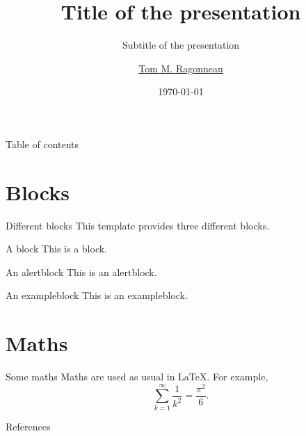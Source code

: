 \documentclass[
]{presentation}
\title{Title of the presentation}
\subtitle{Subtitle of the presentation}
\date{\today}
\author{\href{https://tomragonneau.com/}{Tom M. Ragonneau}}
\institute{
    Department of Applied Mathematics\\
    The Hong Kong Polytechnic University
}
\begin{document}
\maketitle

\begin{frame}{Table of contents}
    \tableofcontents[hideallsubsections]
\end{frame}

\section{Blocks}

\begin{frame}{Different blocks}
    This template provides \alert{three} different blocks.

    \begin{block}{A block}
        This is a block.
    \end{block}

    \begin{alertblock}{An alertblock}
        This is an alertblock.
    \end{alertblock}

    \begin{exampleblock}{An exampleblock}
        This is an exampleblock.
    \end{exampleblock}
\end{frame}

\section{Maths}

\begin{frame}{Some maths}
    Maths are used as usual in \LaTeX.
    For example,
    \begin{equation*}
        \sum_{k = 1}^{\infty} \frac{1}{k^2} = \frac{\pi^2}{6}.
    \end{equation*}
\end{frame}

\appendix

\begin{frame}[t,allowframebreaks]{References}
    \nocite{knut86}
    \printbibliography[heading=none]
\end{frame}
\end{document}
